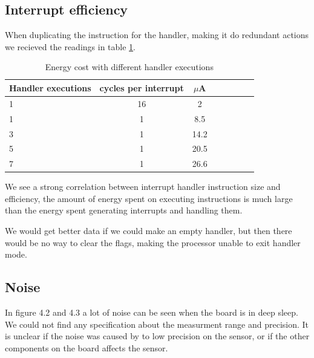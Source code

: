 \subsection{Interrupt efficiency}
When duplicating the instruction for the handler, making it do redundant actions we recieved the readings in table \ref{tab:Handler}.

\begin{table}

\begin{center}
\begin{tabular}{l*{6}{c}r}
Handler executions & cycles per interrupt & $\mu$A \\
\hline
1 & 16 & 2  \\
1 & 1 & 8.5  \\
3 & 1 & 14.2  \\
5 & 1 & 20.5  \\
7 & 1 & 26.6  \\
\end{tabular}
\end{center}
\label{tab:Handler}
\caption{Energy cost with different handler executions}

\end{table}
We see a strong correlation between interrupt handler instruction size and efficiency, the amount of energy spent on executing instructions is much large than the energy spent generating interrupts and handling them.

We would get better data if we could make an empty handler, but then there would be no way to clear the flags, making the processor unable to exit handler mode.

\subsection{Noise}
In figure 4.2 and 4.3 a lot of noise can be seen when the board is in deep sleep. We could not find any specification about the measurment range and precision. It is unclear if the noise was caused by to low precision on the sensor, or if the other components on the board affects the sensor.

